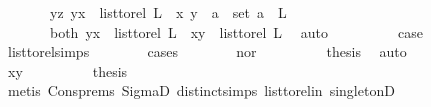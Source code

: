 \begin{isabellebody}
\ \ \ \ \ \ {\isacharbar}{\kern0pt}\ {\isacharparenleft}{\kern0pt}yz{\isacharparenright}{\kern0pt}\ {\isachardoublequoteopen}{\isacharparenleft}{\kern0pt}y{\isacharcomma}{\kern0pt}x{\isacharparenright}{\kern0pt}\ {\isasymin}\ list{\isacharunderscore}{\kern0pt}to{\isacharunderscore}{\kern0pt}rel\ L\ {\isasymand}\ {\isacharparenleft}{\kern0pt}x{\isacharcomma}{\kern0pt}\ y{\isacharparenright}{\kern0pt}\ {\isasymin}\ {\isacharbraceleft}{\kern0pt}a{\isacharbraceright}{\kern0pt}\ {\isasymtimes}\ set\ {\isacharparenleft}{\kern0pt}a\ {\isacharhash}{\kern0pt}\ L{\isacharparenright}{\kern0pt}{\isachardoublequoteclose}\isanewline
\ \ \ \ \ \ {\isacharbar}{\kern0pt}\ {\isacharparenleft}{\kern0pt}both{\isacharparenright}{\kern0pt}\ {\isachardoublequoteopen}{\isacharparenleft}{\kern0pt}y{\isacharcomma}{\kern0pt}x{\isacharparenright}{\kern0pt}\ {\isasymin}\ list{\isacharunderscore}{\kern0pt}to{\isacharunderscore}{\kern0pt}rel\ L\ {\isasymand}\ {\isacharparenleft}{\kern0pt}x{\isacharcomma}{\kern0pt}y{\isacharparenright}{\kern0pt}\ {\isasymin}\ list{\isacharunderscore}{\kern0pt}to{\isacharunderscore}{\kern0pt}rel\ L{\isachardoublequoteclose}\ \isamarkupfalse%
\ auto\isanewline
\ \ \ \ \ \ \isamarkupfalse%
\ \isamarkupfalse%
\ {\isacharquery}{\kern0pt}case\ \isamarkupfalse%
\ list{\isacharunderscore}{\kern0pt}to{\isacharunderscore}{\kern0pt}rel{\isachardot}{\kern0pt}simps\ \isanewline
\ \ \ \ \ \ \isamarkupfalse%
{\isacharparenleft}{\kern0pt}cases{\isacharparenright}{\kern0pt}\isanewline
\ \ \ \ \ \ \isamarkupfalse%
\ nor\isanewline
\ \ \ \ \ \ \isamarkupfalse%
\ \isamarkupfalse%
\ {\isacharquery}{\kern0pt}thesis\ \isamarkupfalse%
\ auto\isanewline
\ \ \ \ \ \ \isamarkupfalse%
\isanewline
\ \ \ \ \ \ \isamarkupfalse%
\ xy\isanewline
\ \ \ \ \ \ \isamarkupfalse%
\ \isamarkupfalse%
\ {\isacharquery}{\kern0pt}thesis\isanewline
\ \ \ \ \ \ \ \ \isamarkupfalse%
\ {\isacharparenleft}{\kern0pt}metis\ Cons{\isachardot}{\kern0pt}prems{\isacharparenleft}{\kern0pt}{}{\isacharparenright}{\kern0pt}\ SigmaD{}\ distinct{\isachardot}{\kern0pt}simps{\isacharparenleft}{\kern0pt}{}{\isacharparenright}{\kern0pt}\ list{\isacharunderscore}{\kern0pt}to{\isacharunderscore}{\kern0pt}rel{\isacharunderscore}{\kern0pt}in\ singletonD{\isacharparenright}{\kern0pt}\ \isanewline
\ \ \ \ \ \ \isamarkupfalse%
\isanewline

\end{isabellebody}
